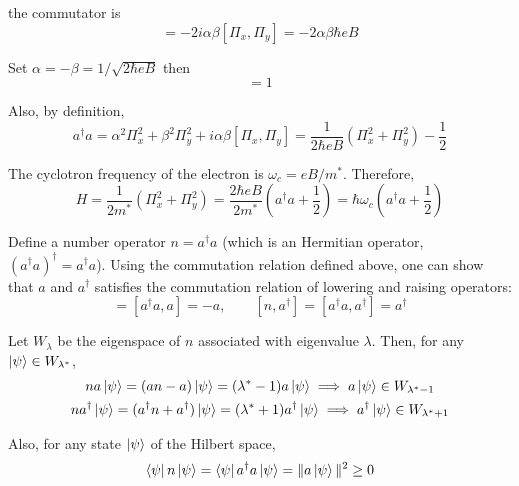 \documentclass[a4paper,11pt]{article}
\begin{document}
the commutator is
\begin{equation}
  [a, a^\dagger] = -2i\alpha\beta [\Pi_x, \Pi_y] = -2\alpha\beta \hbar e B
\end{equation}

Set $\alpha = -\beta = 1 / \sqrt{2\hbar eB}$ then
\begin{equation}
  [a, a^\dagger] = 1
\end{equation}

Also, by definition,
\begin{equation}
  a^\dagger a = \alpha^2 \Pi_x^2 + \beta^2 \Pi_y^2 + i\alpha\beta [\Pi_x, \Pi_y] = \frac{1}{2\hbar eB} (\Pi_x^2 + \Pi_y^2) - \frac{1}{2}
\end{equation}


The cyclotron frequency of the electron is $\omega_c = eB / m^*$. Therefore,
\begin{equation}
  H = \frac{1}{2m^*} (\Pi_x^2 + \Pi_y^2) = \frac{2\hbar eB}{2m^*}\left(a^\dagger a + \frac{1}{2}\right) = \hbar \omega_c \left( a^\dagger a + \frac{1}{2} \right)
\end{equation}

Define a number operator $n = a^\dagger a$ (which is an Hermitian operator, $(a^\dagger a)^\dagger = a^\dagger a$). Using the commutation relation defined above, one can show that $a$ and $a^\dagger$ satisfies the commutation relation of lowering and raising operators:
\begin{equation}
  [n, a] = [a^\dagger a, a] = -a,\qquad [n, a^\dagger] = [a^\dagger a, a^\dagger] = a^\dagger
\end{equation}

Let $W_\lambda$ be the eigenspace of $n$ associated with eigenvalue $\lambda$. Then, for any $\ket{\psi} \in W_{\lambda^*}$,
\begin{gather}
  n a \ket{\psi} = (a n - a) \ket{\psi} = (\lambda^* - 1) a \ket{\psi} \implies a \ket{\psi} \in W_{\lambda^* - 1} \\
  n a^\dagger \ket{\psi} = (a^\dagger n + a^\dagger) \ket{\psi} = (\lambda^* + 1) a^\dagger \ket{\psi} \implies a^\dagger \ket{\psi} \in W_{\lambda^* + 1}
\end{gather}

Also, for any state $\ket{\psi}$ of the Hilbert space,
\begin{equation}
  \bra{\psi} n \ket{\psi} = \bra{\psi} a^\dagger a \ket{\psi} = \| a \ket{\psi} \|^2 \geq 0
\end{equation}
\end{document}
